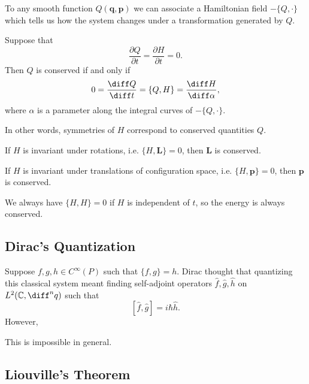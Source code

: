 \documentclass[12pt]{article}
\begin{document}
To any smooth function $Q(\mathbf{q}, \mathbf{p})$ we can associate a Hamiltonian field $- \{Q, \cdot\}$ which tells us how the system changes under a transformation generated by $Q$.
\begin{theorem}
	Suppose that
	\[
	\frac{\partial Q}{\partial t} = \frac{\partial H}{\partial t} = 0.
	\]
	Then $Q$ is conserved if and only if
	\[
		0 = \frac{\diff Q}{\diff t} = \{Q, H\} = \frac{\diff H}{\diff \alpha},
	\]
	where $\alpha$ is a parameter along the integral curves of $-\{Q, \cdot\}$.

	In other words, symmetries of $H$ correspond to conserved quantities $Q$.
\end{theorem}

\begin{exbox}
	If $H$ is invariant under rotations, i.e. $\{H, \mathbf{L}\} = 0$, then $\mathbf{L}$ is conserved.

	If $H$ is invariant under translations of configuration space, i.e. $\{H, \mathbf{p}\} = 0$, then $\mathbf{p}$ is conserved.

	We always have $\{H, H\} = 0$ if $H$ is independent of $t$, so the energy is always conserved.
\end{exbox}

\subsection{Dirac's Quantization}
\label{sub:dirac_quant}

Suppose $f, g, h \in C^{\infty}(P)$ such that $\{f, g\}= h$. Dirac thought that quantizing this classical system meant finding self-adjoint operators $\hat f, \hat g, \hat h$ on $L^2(\mathbb{C}, \diff^n q)$ such that
\[
	[\hat f, \hat g] = i \hbar \hat h.
\]
However,
\begin{theorem}
	This is impossible in general.
\end{theorem}

\subsection{Liouville's Theorem}
\label{sub_lou_thm}
\end{document}
